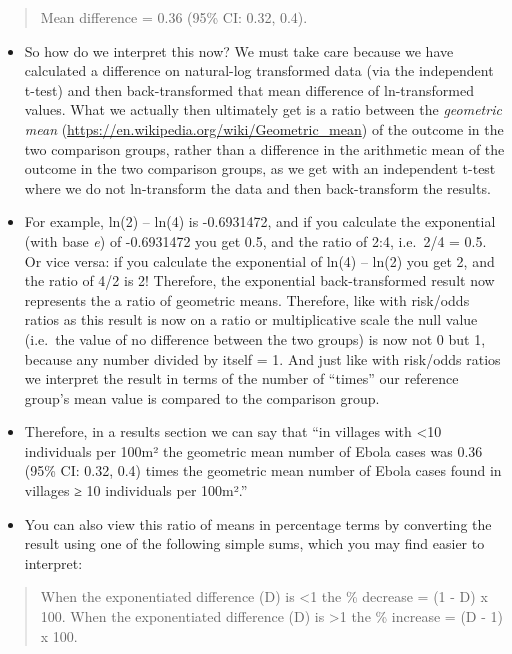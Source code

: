 \documentclass[
]{book}
\begin{document}
\begin{quote}
Mean difference = 0.36 (95\% CI: 0.32, 0.4).
\end{quote}

\begin{itemize}
\item
  So how do we interpret this now? We must take care because we have calculated a difference on natural-log transformed data (via the independent t-test) and then back-transformed that mean difference of ln-transformed values. What we actually then ultimately get is a ratio between the \emph{geometric mean} (\url{https://en.wikipedia.org/wiki/Geometric_mean}) of the outcome in the two comparison groups, rather than a difference in the arithmetic mean of the outcome in the two comparison groups, as we get with an independent t-test where we do not ln-transform the data and then back-transform the results.
\item
  For example, ln(2) -- ln(4) is -0.6931472, and if you calculate the exponential (with base \emph{e}) of -0.6931472 you get 0.5, and the ratio of 2:4, i.e.~2/4 = 0.5. Or vice versa: if you calculate the exponential of ln(4) -- ln(2) you get 2, and the ratio of 4/2 is 2! Therefore, the exponential back-transformed result now represents the a ratio of geometric means. Therefore, like with risk/odds ratios as this result is now on a ratio or multiplicative scale the null value (i.e.~the value of no difference between the two groups) is now not 0 but 1, because any number divided by itself = 1. And just like with risk/odds ratios we interpret the result in terms of the number of ``times'' our reference group's mean value is compared to the comparison group.
\item
  Therefore, in a results section we can say that ``in villages with \textless10 individuals per 100m² the geometric mean number of Ebola cases was 0.36 (95\% CI: 0.32, 0.4) times the geometric mean number of Ebola cases found in villages ≥ 10 individuals per 100m².''
\item
  You can also view this ratio of means in percentage terms by converting the result using one of the following simple sums, which you may find easier to interpret:
\end{itemize}

\begin{quote}
When the exponentiated difference (D) is \textless1 the \% decrease = (1 - D) x 100.
When the exponentiated difference (D) is \textgreater1 the \% increase = (D - 1) x 100.
\end{quote}
\end{document}

